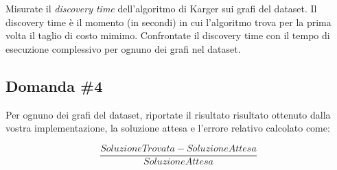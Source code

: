 \begin{displayquote}
Misurate il \textit{discovery time} dell'algoritmo di Karger sui grafi del dataset. Il discovery time è il momento (in secondi) in cui l'algoritmo trova per la prima volta il taglio di costo mimimo.  Confrontate il discovery time con il tempo di esecuzione complessivo per ognuno dei grafi nel dataset.
\end{displayquote}

\subsection{Domanda \#4}
\label{sec:question-4}

\begin{displayquote}
Per ognuno dei grafi del dataset, riportate il risultato risultato ottenuto dalla vostra implementazione, la soluzione attesa e l'errore relativo calcolato come:

\begin{equation*}
    \frac{SoluzioneTrovata - SoluzioneAttesa}{SoluzioneAttesa}
\end{equation*}

\end{displayquote}
